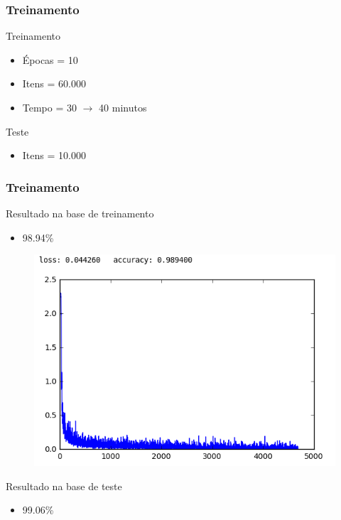 \documentclass[tikz,10pt]{beamer}
\begin{document}
\begin{frame}
	\frametitle{Treinamento}
	\centering
		\centering
		\par Treinamento
		\begin{itemize}
			\item Épocas = 10
			\item Itens = 60.000
			\item Tempo = 30 $\longrightarrow$ 40 minutos
		\end{itemize}		
	\centering
	\par Teste
	\begin{itemize}
		\item Itens = 10.000
	\end{itemize}	
\end{frame}

\begin{frame}
	\frametitle{Treinamento}		
	\centering
	\par Resultado na base de treinamento
	\begin{itemize}
		\item 98.94\%
	\end{itemize}	
	\begin{figure}
		\centering
		\includegraphics[width=0.5\linewidth]{images/resultados/network_1/loss_history}
		\label{fig:losshistory}
	\end{figure}
	\par Resultado na base de teste
	\begin{itemize}
		\item 99.06\%
	\end{itemize}	

\end{frame}
\end{document}
